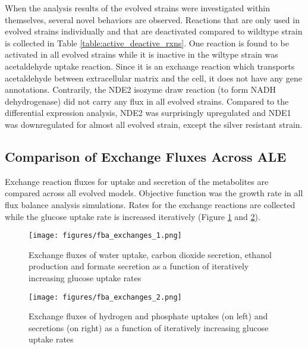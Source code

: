 

When the analysis results of the evolved strains were investigated within themselves, several novel behaviors are observed. Reactions that are only used in evolved strains individually and that are deactivated compared to wildtype strain is collected in Table \ref{table:active_deactive_rxns}. One reaction is found to be activated in all evolved strains while it is inactive in the wiltype strain was acetaldehyde uptake reaction. Since it is an exchange reaction which transports acetaldehyde between extracellular matrix and the cell, it does not have any gene annotations. Contrarily, the NDE2 isozyme draw reaction (to form NADH dehydrogenase) did not carry any flux in all evolved strains. Compared to the differential expression analysis, NDE2 was surprisingly upregulated and NDE1 was downregulated for almost all evolved strain, except the silver resistant strain.



\subsection{Comparison of Exchange Fluxes Across ALE}

Exchange reaction fluxes for uptake and secretion of the metabolites are compared across all evolved models. Objective function was the growth rate in all flux balance analysis simulations. Rates for the exchange reactions are collected while the glucose uptake rate is increased iteratively (Figure \ref{fig:fba_exchanges_1} and \ref{fig:fba_exchanges_2}).

\begin{figure}[H]
  \begin{center}
  \texttt{[image: figures/fba\_exchanges\_1.png]}
  \caption[Exchange fluxes of water, carbon dioxide, ethanol and formate secretion as a function of iteratively increasing glucose uptake rates]{Exchange fluxes of water uptake, carbon dioxide secretion, ethanol production and formate secretion as a function of iteratively increasing glucose uptake rates}
  \label{fig:fba_exchanges_1}
  \end{center}
  \end{figure}
\vspace{-1.0cm}

\begin{figure}[H]
  \begin{center}
  \texttt{[image: figures/fba\_exchanges\_2.png]}
  \caption[Exchange fluxes of hydrogen and phosphate uptakes (on the left) and secretions (on the right) as a function of iteratively increasing glucose uptake rates]{Exchange fluxes of hydrogen and phosphate uptakes (on left) and secretions (on right) as a function of iteratively increasing glucose uptake rates}
  \label{fig:fba_exchanges_2}
  \end{center}
  \end{figure}
\vspace{-1.0cm}

